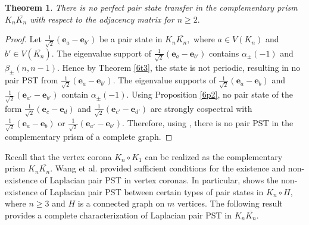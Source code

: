 \documentclass[12pt,a4paper]{article}
\newtheorem{thm}{Theorem}
\def \e {{\bf e}}
\def \e {{\mathbf e}}
\newcommand{\ob}[1]{\left(#1\right)}
\begin{document}
\begin{thm}\label{6t9}
    There is no perfect pair state transfer in the complementary prism $K_n\overline{K_n}$ with respect to the adjacency matrix for $n\geq 2.$
\end{thm}
\begin{proof}
    Let $\frac{1}{\sqrt{2}}\ob{\e_a-\e_{b'}}$ be a pair state in $K_n\overline{K_n},$ where $a\in V(K_n)$ and $b'\in V(\overline{K_n}).$ The eigenvalue support of $\frac{1}{\sqrt{2}}\ob{\e_a-\e_{b'}}$ contains $\alpha_{\pm}(-1)$ and $\beta_{\pm}(n,n-1).$ Hence by Theorem \ref{6t3}, the state is not periodic, resulting in no pair PST from $\frac{1}{\sqrt{2}}\ob{\e_a-\e_{b'}}.$ 
The eigenvalue supports of $\frac{1}{\sqrt{2}}\ob{\e_a-\e_b}$ and $\frac{1}{\sqrt{2}}\ob{\e_{a'}-\e_{b'}}$ contain $\alpha_{\pm}(-1).$ Using Proposition \ref{6p2}, no pair state of the form $\frac{1}{\sqrt{2}}\ob{\e_c-\e_d}$ and $\frac{1}{\sqrt{2}}\ob{\e_{c'}-\e_{d'}}$ are strongly cospectral with $\frac{1}{\sqrt{2}}\ob{\e_a-\e_b}$ or $\frac{1}{\sqrt{2}}\ob{\e_{a'}-\e_{b'}}.$ Therefore, using \cite[Lemma 5.1]{god7}, there is no pair PST in the complementary prism of a complete graph. 
\end{proof}
Recall that the vertex corona $K_n\circ K_1$ can be realized as the complementary prism $K_n\overline{K_n}.$ Wang et al. \cite{wang} provided sufficient conditions for the existence and non-existence of Laplacian pair PST in vertex coronas. In particular, \cite[Example 3.2]{wang} shows the non-existence of Laplacian pair PST between certain types of pair states in $K_n\circ H$, where $n\geq 3$ and $H$ is a connected graph on $m$ vertices. The following result provides a complete characterization of Laplacian pair PST in $K_n\overline{K_n}$.
\end{document}
